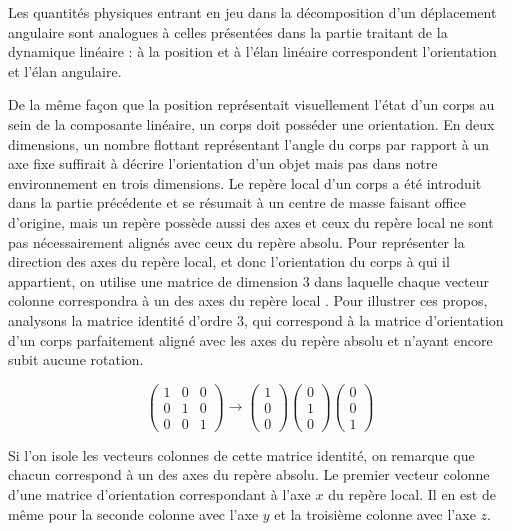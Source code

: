 Les quantités physiques entrant en jeu dans la décomposition d'un
déplacement angulaire sont analogues à celles présentées dans la
partie traitant de la dynamique linéaire : à la position et à l'élan
linéaire correspondent l'orientation et l'élan angulaire.

De la même façon que la position représentait visuellement l'état d'un
corps au sein de la composante linéaire, un corps doit posséder une
orientation. En deux dimensions, un nombre flottant représentant
l'angle du corps par rapport à un axe fixe suffirait à décrire
l'orientation d'un objet mais pas dans notre environnement en trois
dimensions. Le repère local d'un corps a été introduit dans la partie
précédente et se résumait à un centre de masse faisant office
d'origine, mais un repère possède aussi des axes et ceux du repère
local ne sont pas nécessairement alignés avec ceux du repère
absolu. Pour représenter la direction des axes du repère local, et
donc l'orientation du corps à qui il appartient, on utilise une
matrice de dimension 3 dans laquelle chaque vecteur colonne
correspondra à un des axes du repère local \cite{witkit97}. Pour
illustrer ces propos, analysons la matrice identité d'ordre 3, qui
correspond à la matrice d'orientation d'un corps parfaitement aligné
avec les axes du repère absolu et n'ayant encore subit aucune
rotation.

\[
\begin{pmatrix}
  1 & 0 & 0 \\ 0 & 1 & 0 \\ 0 & 0 & 1
\end{pmatrix}
\rightarrow
\begin{pmatrix}
  1 \\ 0 \\ 0
\end{pmatrix}
\begin{pmatrix}
  0 \\ 1 \\ 0
\end{pmatrix}
\begin{pmatrix}
  0 \\ 0 \\ 1
\end{pmatrix}
\]

Si l'on isole les vecteurs colonnes de cette matrice identité, on
remarque que chacun correspond à un des axes du repère absolu. Le
premier vecteur colonne d'une matrice d'orientation correspondant à
l'axe $x$ du repère local. Il en est de même pour la seconde colonne
avec l'axe $y$ et la troisième colonne avec l'axe $z$.

